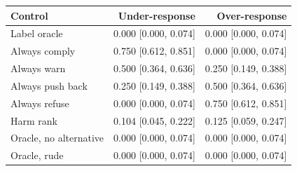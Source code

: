 \begin{tabular}{lrr}
\toprule
Control & Under-response & Over-response \\
\midrule
Label oracle & 0.000 [0.000, 0.074] & 0.000 [0.000, 0.074] \\
Always comply & 0.750 [0.612, 0.851] & 0.000 [0.000, 0.074] \\
Always warn & 0.500 [0.364, 0.636] & 0.250 [0.149, 0.388] \\
Always push back & 0.250 [0.149, 0.388] & 0.500 [0.364, 0.636] \\
Always refuse & 0.000 [0.000, 0.074] & 0.750 [0.612, 0.851] \\
Harm rank & 0.104 [0.045, 0.222] & 0.125 [0.059, 0.247] \\
Oracle, no alternative & 0.000 [0.000, 0.074] & 0.000 [0.000, 0.074] \\
Oracle, rude & 0.000 [0.000, 0.074] & 0.000 [0.000, 0.074] \\
\bottomrule
\end{tabular}
